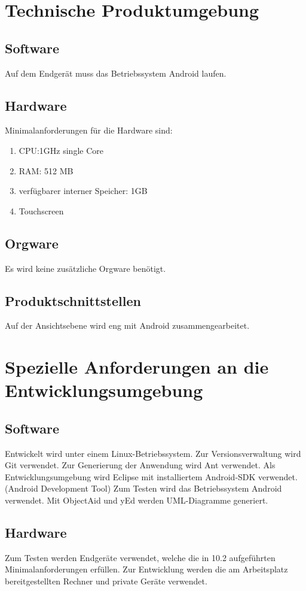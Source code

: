 \documentclass[a4paper, 10pt]{article}
\begin{document}
\section{Technische Produktumgebung}
\subsection{Software}
Auf dem Endgerät muss das Betriebssystem Android laufen.
\subsection{Hardware}
Minimalanforderungen für die Hardware sind:
\begin{enumerate}
\item CPU:1GHz single Core
\item RAM: 512 MB
\item verfügbarer interner Speicher: 1GB 
\item Touchscreen
\end{enumerate}
\subsection{Orgware}
Es wird keine zusätzliche Orgware benötigt.
\subsection{Produktschnittstellen}
Auf der Ansichtsebene wird eng mit Android zusammengearbeitet. 

\section{Spezielle Anforderungen an die Entwicklungsumgebung}
\subsection{Software}
Entwickelt wird unter einem Linux-Betriebssystem.
Zur Versionsverwaltung wird Git verwendet.
Zur Generierung der Anwendung wird Ant verwendet.
Als Entwicklungsumgebung wird Eclipse mit installiertem Android-SDK verwendet. (Android Development Tool)
Zum Testen wird das Betriebssystem Android verwendet.
Mit ObjectAid und yEd werden UML-Diagramme generiert.

\subsection{Hardware}
Zum Testen werden Endgeräte verwendet, welche die in 10.2 aufgeführten Minimalanforderungen erfüllen. Zur Entwicklung werden die am Arbeitsplatz bereitgestellten Rechner und private Geräte verwendet.
\end{document}
